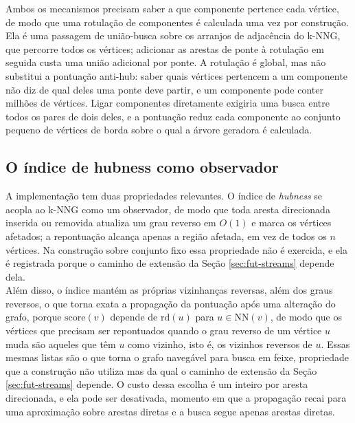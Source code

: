 Ambos os mecanismos precisam saber a que componente pertence cada vértice, de modo que uma rotulação de componentes é calculada uma vez por construção. Ela é uma passagem de união-busca sobre os arranjos de adjacência do \ac{k-NNG}, que percorre todos os vértices; adicionar as arestas de ponte à rotulação em seguida custa uma união adicional por ponte. A rotulação é global, mas não substitui a pontuação anti-hub: saber quais vértices pertencem a um componente não diz de qual deles uma ponte deve partir, e um componente pode conter milhões de vértices. Ligar componentes diretamente exigiria uma busca entre todos os pares de dois deles, e a pontuação reduz cada componente ao conjunto pequeno de vértices de borda sobre o qual a árvore geradora é calculada.\\

\subsection{O índice de hubness como observador\label{sec:hubindex}}

A implementação tem duas propriedades relevantes. O índice de \textit{hubness} se acopla ao \ac{k-NNG} como um observador, de modo que toda aresta direcionada inserida ou removida atualiza um grau reverso em $O(1)$ e marca os vértices afetados; a repontuação alcança apenas a região afetada, em vez de todos os $n$ vértices. Na construção sobre conjunto fixo essa propriedade não é exercida, e ela é registrada porque o caminho de extensão da Seção \ref{sec:fut-streams} depende dela.\\

Além disso, o índice mantém as próprias vizinhanças reversas, além dos graus reversos, o que torna exata a propagação da pontuação após uma alteração do grafo, porque $\mathrm{score}(v)$ depende de $\mathrm{rd}(u)$ para $u \in \mathrm{NN}(v)$, de modo que os vértices que precisam ser repontuados quando o grau reverso de um vértice $u$ muda são aqueles que têm $u$ como vizinho, isto é, os vizinhos reversos de $u$. Essas mesmas listas são o que torna o grafo navegável para busca em feixe, propriedade que a construção não utiliza mas da qual o caminho de extensão da Seção \ref{sec:fut-streams} depende. O custo dessa escolha é um inteiro por aresta direcionada, e ela pode ser desativada, momento em que a propagação recai para uma aproximação sobre arestas diretas e a busca segue apenas arestas diretas.\\

